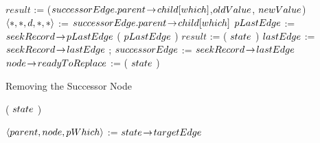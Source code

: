 \begin{limitscope}
\begin{algorithm}[!thb]
{{			$result$ := \CAS($successorEdge.parent \!\rightarrow\! child[which]$,$oldValue$, $newValue$)\;
			$\langle  \ast, \ast, d, \ast, \ast  \rangle$ := $successorEdge.parent \!\rightarrow\! child[which]$\;
			$pLastEdge$ := $seekRecord \!\rightarrow\! pLastEdge$\;
			{
				 \HelpTargetNode( $pLastEdge$ )\;
			}			
      \BlankLine			
 	    $result$ := \FindSmallest( $state$ )\;
			$lastEdge$ := $seekRecord \!\rightarrow\! lastEdge$\;
			{
			   \Break;
			} 
			\lElse
			{
			   $successorEdge$ := $seekRecord \!\rightarrow\! lastEdge$
			}
   }
   \BlankLine
	 $node \!\rightarrow\! readyToReplace$ := \True\;
   \UpdateMode( $state$ )\;	
}
\caption{Removing the Successor Node}
\label{algo:remove}
\end{algorithm}




\begin{algorithm}[!thb]
\DefineKeyWords



\DontPrintSemicolon
\Boolean \Cleanup( $state$ )\;
\PrintSemicolon
\Begin
{
	
	
	 $\langle parent, node, pWhich \rangle$ := $state \!\rightarrow\! targetEdge$\;
	 
	
	 \BlankLine
	 
	 {
	  	   
}}
\end{algorithm}
\end{limitscope}
